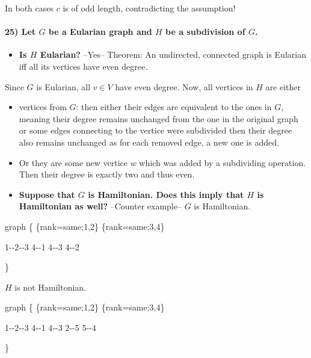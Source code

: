 \documentclass[
]{article}
\newenvironment{Shaded}{}{}
\newcommand{\NormalTok}[1]{#1}
\providecommand{\tightlist}{%
  \setlength{\itemsep}{0pt}\setlength{\parskip}{0pt}}
\begin{document}
In both cases \(c\) is of odd length, contradicting the assumption!

\hypertarget{let-g-be-a-eularian-graph-and-h-be-a-subdivision-of-g.}{%
\paragraph{\texorpdfstring{25) Let \(G\) be a Eularian graph and \(H\)
be a subdivision of
\(G\).}{25) Let G be a Eularian graph and H be a subdivision of G.}}\label{let-g-be-a-eularian-graph-and-h-be-a-subdivision-of-g.}}

\begin{itemize}
\tightlist
\item
  \textbf{Is \(H\) Eularian?} --Yes-- Theorem: An undirected, connected
  graph is Eularian iff all its vertices have even degree.
\end{itemize}

Since \(G\) is Eularian, all \(v \in V\) have even degree. Now, all
vertices in \(H\) are either

\begin{itemize}
\item
  vertices from \(G\): then either their edges are equivalent to the
  ones in \(G\), meaning their degree remains unchanged from the one in
  the original graph or some edges connecting to the vertice were
  subdivided then their degree also remains unchanged as for each
  removed edge, a new one is added.
\item
  Or they are some new vertice \(w\) which was added by a subdividing
  operation. Then their degree is exactly two and thus even.
\item
  \textbf{Suppose that \(G\) is Hamiltonian. Does this imply that \(H\)
  is Hamiltonian as well?} --Counter example-- \(G\) is Hamiltonian.
\end{itemize}

\begin{Shaded}
\begin{Highlighting}[]
\NormalTok{graph \{}
\NormalTok{\{rank=same;1,2\}}
\NormalTok{\{rank=same;3,4\}}

\NormalTok{1{-}{-}2{-}{-}3}
\NormalTok{4{-}{-}1}
\NormalTok{4{-}{-}3}
\NormalTok{4{-}{-}2}

\NormalTok{\}}
\end{Highlighting}
\end{Shaded}

\(H\) is not Hamiltonian.

\begin{Shaded}
\begin{Highlighting}[]
\NormalTok{graph \{}
\NormalTok{\{rank=same;1,2\}}
\NormalTok{\{rank=same;3,4\}}

\NormalTok{1{-}{-}2{-}{-}3}
\NormalTok{4{-}{-}1}
\NormalTok{4{-}{-}3}
\NormalTok{2{-}{-}5}
\NormalTok{5{-}{-}4}

\NormalTok{\}}
\end{Highlighting}
\end{Shaded}
\end{document}
